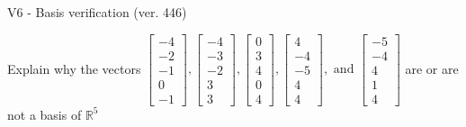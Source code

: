 \begin{exercise}
  \begin{exerciseTitle}V6 - Basis verification (ver. 446)\end{exerciseTitle}
  \begin{exerciseStatement}
    Explain why the vectors \(\left[\begin{array}{r}
-4 \\
-2 \\
-1 \\
0 \\
-1
\end{array}\right] , \left[\begin{array}{r}
-4 \\
-3 \\
-2 \\
3 \\
3
\end{array}\right] , \left[\begin{array}{r}
0 \\
3 \\
4 \\
0 \\
4
\end{array}\right] , \left[\begin{array}{r}
4 \\
-4 \\
-5 \\
4 \\
4
\end{array}\right] , \text{ and } \left[\begin{array}{r}
-5 \\
-4 \\
4 \\
1 \\
4
\end{array}\right]\) are or are not a basis of \(\mathbb{R}^5\)	



\end{exerciseStatement}
\end{exercise}
